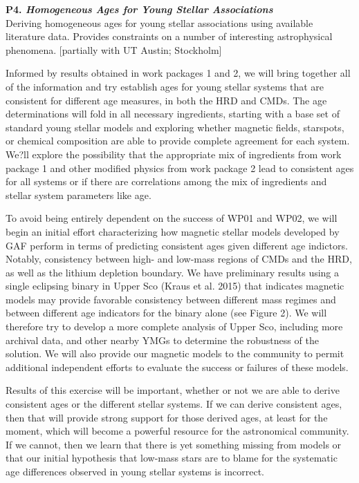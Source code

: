 \documentclass[12pt,a4paper]{article}
\begin{document}
\textbf{P4. \emph{Homogeneous Ages for Young Stellar Associations}} \\
Deriving homogeneous ages for young stellar associations using available literature data. Provides constraints on a number of interesting astrophysical phenomena. [partially with UT Austin; Stockholm]

Informed by results obtained in work packages 1 and 2, we will bring together all of the information and try establish ages for young stellar systems that are consistent for different age measures, in both the HRD and CMDs. The age determinations will fold in all necessary ingredients, starting with a base set of standard young stellar models and exploring whether magnetic fields, starspots, or chemical composition are able to provide complete agreement for each system. We?ll explore the possibility that the appropriate mix of ingredients from work package 1 and other modified physics from work package 2 lead to consistent ages for all systems or if there are correlations among the mix of ingredients and stellar system parameters like age.

To avoid being entirely dependent on the success of WP01 and WP02, we will begin an initial effort characterizing how magnetic stellar models developed by GAF perform in terms of predicting consistent ages given different age indictors. Notably, consistency between high- and low-mass regions of CMDs and the HRD, as well as the lithium depletion boundary. We have preliminary results using a single eclipsing binary in Upper Sco (Kraus et al. 2015) that indicates magnetic models may provide favorable consistency between different mass regimes and between different age indicators for the binary alone (see Figure 2). We will therefore try to develop a more complete analysis of Upper Sco, including more archival data, and other nearby YMGs to determine the robustness of the solution. We will also provide our magnetic models to the community to permit additional independent efforts to evaluate the success or failures of these models.

Results of this exercise will be important, whether or not we are able to derive consistent ages or the different stellar systems. If we can derive consistent ages, then that will provide strong support for those derived ages, at least for the moment, which will become a powerful resource for the astronomical community. If we cannot, then we learn that there is yet something missing from models or that our initial hypothesis that low-mass stars are to blame for the systematic age differences observed in young stellar systems is incorrect.
\end{document}
